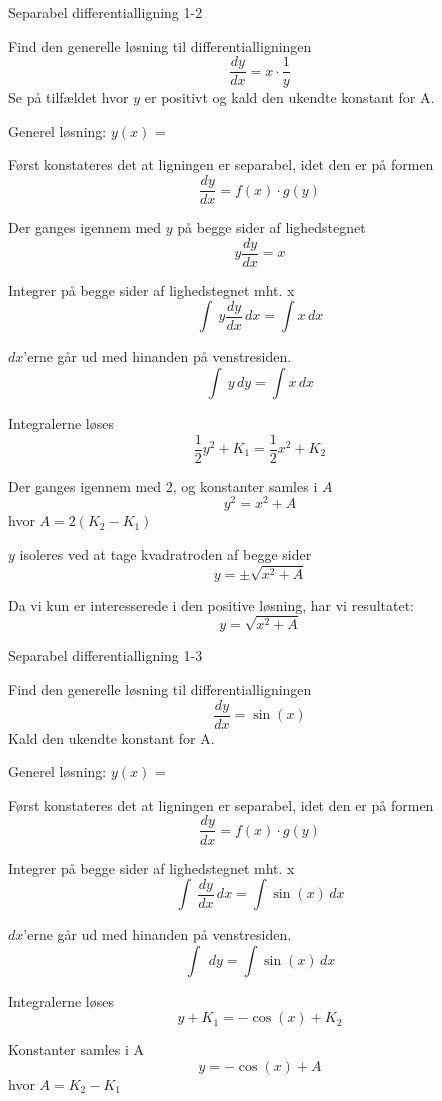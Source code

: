 \documentclass{article}
\begin{document}
\begin{exercise}{Separabel differentialligning 1-2}

	
	Find den generelle løsning til differentialligningen 
	\[
	\frac{dy}{dx} = x  \cdot \frac{1}{y}
	\]
	Se på tilfældet hvor $y$ er positivt og kald den ukendte konstant for A.
	
	Generel løsning: $y(x)$ = 
	
	\hint
	
	Først konstateres det at ligningen er separabel, idet den er på formen
	\[
	\frac{dy}{dx} = f(x) \cdot g(y)
	\]
	
	\hint 
	Der ganges igennem med $y$ på begge sider af lighedstegnet
	\[
	y \frac{dy}{dx} = x
	\]
	
	\hint
	
	Integrer på begge sider af lighedstegnet mht. x
	\[
	\int\ y \frac{dy}{dx}\, dx= \int x\,dx
	\]
	
	\hint
	
	$dx$'erne går ud med hinanden på venstresiden.
	\[
	\int\ y \, dy= \int x\,dx
	\]
	
	\hint
	
	Integralerne løses
	\[
	\frac{1}{2} y^2 + K_1 = \frac{1}{2} x^2 + K_2
	\]
	
	
	\hint
	
	Der ganges igennem med 2, og konstanter samles i $A$
	\[
	y^2 = x^2 + A
	\]
	hvor $A=2(K_2-K_1)$
	
	\hint
	
	$y$ isoleres ved at tage kvadratroden af begge sider
	\[
	y = \pm \sqrt{x^2 + A}
	\]

	\hint
	
	Da vi kun er interesserede i den positive løsning, har vi resultatet:
	\[
	y = \sqrt{x^2 + A}
	\]
	
\end{exercise}

\newpage

\begin{exercise}{Separabel differentialligning 1-3}


	Find den generelle løsning til differentialligningen 
	\[
	\frac{dy}{dx} = \sin(x)
	\]
	Kald den ukendte konstant for A.
	
	Generel løsning: $y(x)$ = 
	
	\hint
	
	Først konstateres det at ligningen er separabel, idet den er på formen
	\[
	\frac{dy}{dx} = f(x) \cdot g(y)
	\]
	
	\hint
	
	Integrer på begge sider af lighedstegnet mht. x
	\[
	\int\ \frac{dy}{dx}\, dx= \int \sin (x)\,dx
	\]
	
	\hint
	
	$dx$'erne går ud med hinanden på venstresiden.
	\[
	\int\ \, dy= \int \sin(x)\,dx
	\]
	
	\hint
	
	Integralerne løses
	\[
	y + K_1 =- \cos (x) + K_2
	\]
	
	
	\hint
	
	Konstanter samles i A
	\[
	y = - \cos(x) + A
	\]
	hvor $A=K_2-K_1$
	
\end{exercise}
\end{document}

